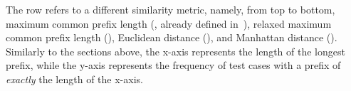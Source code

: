 The row refers to a different similarity metric, namely, from top to bottom, maximum common prefix length (\mcpl, already defined in~), relaxed maximum common prefix length (\rmcpl), Euclidean distance (\euclidean), and Manhattan distance (\manhattan).
Similarly to the sections above, the x-axis represents the length of the longest prefix, while the y-axis represents the frequency of test cases with a prefix of \textit{exactly} the length of the x-axis.
%



\newlength{\mymultiinner}
\setlength{\mymultiinner}{.3\textwidth}
\newlength{\mymultiouter}
\setlength{\mymultiouter}{.3\textwidth}

